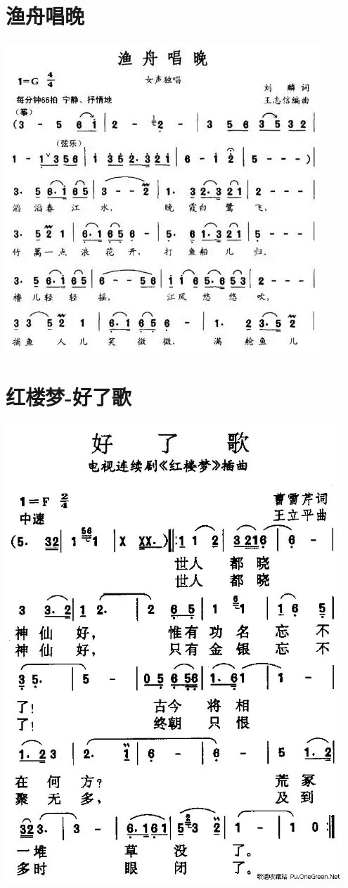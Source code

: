 \documentclass[cn,pad,twocol]{elegantbook}
\begin{document}
\section{渔舟唱晚}\includegraphics[width=\textwidth]{dongxiao/20200819/渔舟唱晚.jpeg}
\section{红楼梦-好了歌}\includegraphics[width=0.95\textwidth]{dongxiao/20200819/红楼梦-好了歌.jpeg}
\end{document}
